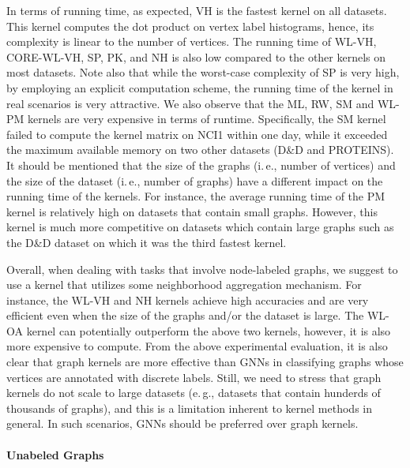 \documentclass[twoside,11pt]{article}
\newcommand{\eg}{e.\,g., }
\newcommand{\ie}{i.\,e., }
\begin{document}
In terms of running time, as expected, VH is the fastest kernel on all datasets.
This kernel computes the dot product on vertex label histograms, hence, its complexity is linear to the number of vertices.
The running time of WL-VH, CORE-WL-VH, SP, PK, and NH is also low compared to the other kernels on most datasets.
Note also that while the worst-case complexity of SP is very high, by employing an explicit computation scheme, the running time of the kernel in real scenarios is very attractive.
We also observe that the ML, RW, SM and WL-PM kernels are very expensive in terms of runtime.
Specifically, the SM kernel failed to compute the kernel matrix on NCI1 within one day, while it exceeded the maximum available memory on two other datasets (D\&D and PROTEINS).
It should be mentioned that the size of the graphs (\ie number of vertices) and the size of the dataset (\ie number of graphs) have a different impact on the running time of the kernels.
For instance, the average running time of the PM kernel is relatively high on datasets that contain small graphs.
However, this kernel is much more competitive on datasets which contain large graphs such as the D\&D dataset on which it was the third fastest kernel.

Overall, when dealing with tasks that involve node-labeled graphs, we suggest to use a kernel that utilizes some neighborhood aggregation mechanism.
For instance, the WL-VH and NH kernels achieve high accuracies and are very efficient even when the size of the graphs and/or the dataset is large.
The WL-OA kernel can potentially outperform the above two kernels, however, it is also more expensive to compute.
From the above experimental evaluation, it is also clear that graph kernels are more effective than GNNs in classifying graphs whose vertices are annotated with discrete labels.
Still, we need to stress that graph kernels do not scale to large datasets (\eg datasets that contain hunderds of thousands of graphs), and this is a limitation inherent to kernel methods in general.
In such scenarios, GNNs should be preferred over graph kernels.


\paragraph{Unabeled Graphs}
\end{document}
